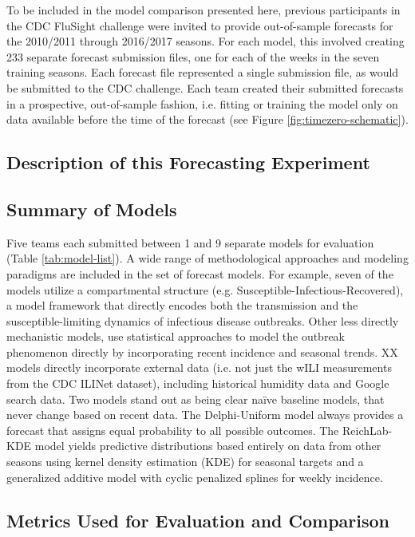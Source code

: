 \documentclass{article}\usepackage[]{graphicx}\usepackage[]{color}
\begin{document}
To be included in the model comparison presented here, previous participants in the CDC FluSight challenge were invited to provide out-of-sample forecasts for the 2010/2011 through 2016/2017 seasons. For each model, this involved creating 233 separate forecast submission files, one for each of the weeks in the seven training seasons.
Each forecast file represented a single submission file, as would be submitted to the CDC challenge. 
Each team created their submitted forecasts in a prospective, out-of-sample fashion, i.e. fitting or training the model only on data available before the time of the forecast (see Figure \ref{fig:timezero-schematic}). 

\subsection{Description of this Forecasting Experiment}


\subsection{Summary of Models}

Five teams each submitted between 1 and 9 separate models for evaluation (Table \ref{tab:model-list}). 
A wide range of methodological approaches and modeling paradigms are included in the set of forecast models.
For example, seven of the models utilize a compartmental structure (e.g. Susceptible-Infectious-Recovered), a model framework that directly encodes both the transmission and the susceptible-limiting dynamics of infectious disease outbreaks.
Other less directly mechanistic models, use statistical approaches to model the outbreak phenomenon directly by incorporating recent incidence and seasonal trends.
XX models directly incorporate external data (i.e. not just the wILI measurements from the CDC ILINet dataset), including historical humidity data and Google search data.
Two models stand out as being clear na\"ive baseline models, that never change based on recent data. 
The Delphi-Uniform model always provides a forecast that assigns equal probability to all possible outcomes. 
The ReichLab-KDE model yields predictive distributions based entirely on data from other seasons using kernel density estimation (KDE) for seasonal targets and a generalized additive model with cyclic penalized splines for weekly incidence.




\subsection{Metrics Used for Evaluation and Comparison}
\end{document}
